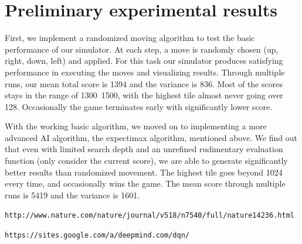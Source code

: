 \documentclass[11pt]{article}
\begin{document}
\section{Preliminary experimental results}

First, we implement a randomized moving algorithm to test the basic performance of our simulator. At each step, a move is randomly chosen (up, right, down, left) and applied. For this task our simulator produces satisfying performance in executing the moves and visualizing results. Through multiple runs, our mean total score is 1394 and the variance is 836. Most of the scores stays in the range of 1300~1500, with the highest tile almost never going over 128. Occasionally the game terminates early with significantly lower score.

With the working basic algorithm, we moved on to implementing a more advanced AI algorithm, the expectimax algorithm, mentioned above. We find out that even with limited search depth and an unrefined rudimentary evaluation function (only consider the current score), we are able to generate significantly better results than randomized movement. The highest tile goes beyond 1024 every time, and occasionally wins the game. The mean score through multiple runs is 5419 and the variance is 1601.

\begin{thebibliography}{9}

 \texttt{http://www.nature.com/nature/journal/v518/n7540/full/nature14236.html}

 \texttt{https://sites.google.com/a/deepmind.com/dqn/}

\end{thebibliography}
\end{document}
